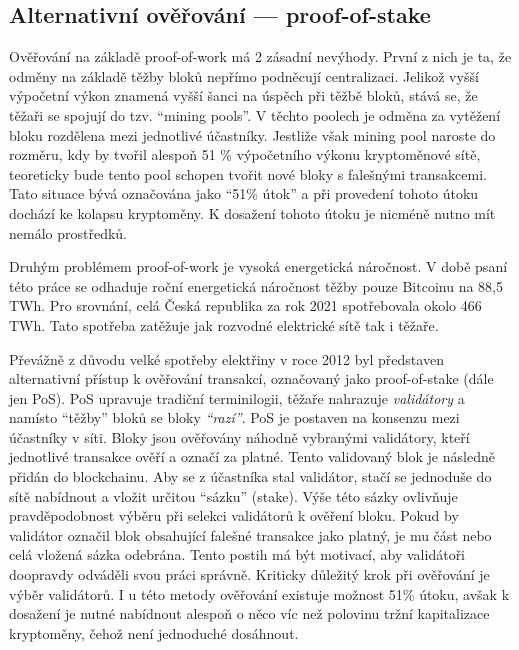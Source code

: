 \subsection{Alternativní ověřování --- proof-of-stake}
\label{proof-of-stake-subsection}
Ověřování na základě proof-of-work má 2 zásadní nevýhody. První z nich je ta, že odměny na základě těžby bloků nepřímo podněcují centralizaci.
Jelikož vyšší výpočetní výkon znamená vyšší šanci na úspěch při těžbě bloků, stává se, že těžaři se spojují do tzv. \enquote{mining pools}.
V těchto poolech je odměna za vytěžení bloku rozdělena mezi jednotlivé účastníky. Jestliže však mining pool naroste do rozměru, kdy by tvořil
alespoň 51 \% výpočetního výkonu kryptoměnové sítě, teoreticky bude tento pool schopen tvořit nové bloky s falešnými transakcemi. Tato situace
bývá označována jako \enquote{51\% útok} a při provedení tohoto útoku dochází ke kolapsu kryptoměny. K dosažení tohoto útoku je nicméně
nutno mít nemálo prostředků.


Druhým problémem proof-of-work je vysoká energetická náročnost. V době psaní této práce se odhaduje roční energetická náročnost těžby pouze Bitcoinu
na 88,5 TWh. Pro srovnání, celá Česká republika za rok 2021 spotřebovala okolo 466 TWh. Tato spotřeba zatěžuje jak rozvodné elektrické sítě tak i těžaře.

Převážně z důvodu velké spotřeby elektřiny v roce 2012 byl představen alternativní přístup k ověřování transakcí, označovaný jako proof-of-stake (dále jen PoS).
PoS upravuje tradiční terminilogii, těžaře nahrazuje \emph{validátory} a namísto \enquote{těžby} bloků se bloky \emph{\enquote{razí}}. PoS je
postaven na konsenzu mezi účastníky v síti. Bloky jsou ověřovány náhodně vybranými validátory, kteří jednotlivé transakce ověří a označí za platné.
Tento validovaný blok je následně přidán do blockchainu. Aby se z účastníka stal validátor, stačí se jednoduše do sítě nabídnout a vložit určitou
\enquote{sázku} (stake). Výše této sázky ovlivňuje pravděpodobnost výběru při selekci validátorů k ověření bloku. Pokud by validátor označil
blok obsahující falešné transakce jako platný, je mu část nebo celá vložená sázka odebrána. Tento postih má být motivací, aby validátoři doopravdy
odváděli svou práci správně. Kriticky důležitý krok při ověřování je výběr validátorů. I u této metody ověřování existuje možnost 51\% útoku,
avšak k dosažení je nutné nabídnout alespoň o něco víc než polovinu tržní kapitalizace kryptoměny, čehož není jednoduché dosáhnout.


